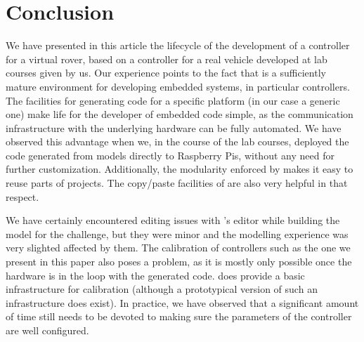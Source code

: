 \section{Conclusion}
\label{sec:conclusion}

We have presented in this article the lifecycle of the development of
a controller for a virtual rover, based on a controller for a real vehicle
developed at lab courses given by us. Our experience points to the fact that  is
a sufficiently mature environment for developing embedded systems, in
particular controllers. The facilities for generating code for a specific platform (in our case a generic one) make life
for the developer of embedded code simple, as the communication infrastructure
with the underlying hardware can be fully automated. We have observed this
advantage when we, in the course of the lab courses, deployed the code
generated from models directly to Raspberry Pis, without any need for further customization. Additionally, the modularity enforced by \af
makes it easy to reuse parts of projects. The copy/paste facilities of \af are
also very helpful in that respect.

We have certainly encountered editing issues with \af's editor while building
the model for the challenge, but they were minor and the modelling experience
was very slighted affected by them. The calibration of controllers such as the
one we present in this paper also poses a problem, as it is mostly only
possible once the hardware is in the loop with the generated code. \af does
provide a basic infrastructure for calibration (although a prototypical version
of such an infrastructure does exist). In practice, we have observed that a
significant amount of time still needs to be devoted to making sure the
parameters of the controller are well configured.
